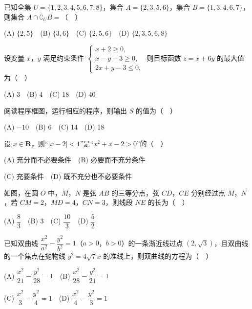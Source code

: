 

\begin{question}
已知全集 \(U=\{1,2,3,4,5,6,7,8\}\)，集合 \(A=\{2,3,5,6\}\)，集合 \(B=\{1,3,4,6,7\}\)，则集合 \(A\cap\complement_U B=\)（　）

(A) \(\{2,5\}\)　(B) \(\{3,6\}\)　(C) \(\{2,5,6\}\)　(D) \(\{2,3,5,6,8\}\)

\end{question}
\begin{question}
设变量 \(x\)，\(y\) 满足约束条件 \(\begin{cases}x+2\geqslant0,\\x-y+3\geqslant0,\\2x+y-3\leqslant0,\end{cases}\) 则目标函数 \(z=x+6y\) 的最大值为（　）

(A) 3　(B) 4　(C) 18　(D) 40

\Needspace{0.4\textheight}
\end{question}
\begin{question}
阅读程序框图，运行相应的程序，则输出 \(S\) 的值为（　）
\nopagebreak[4]
\begin{center}\end{center}
\nopagebreak[4]
(A) \(-10\)　(B) 6　(C) 14　(D) 18

\end{question}
\begin{question}
设 \(x\in\mathbf{R}\)，则“\(|x-2|<1\)”是“\(x^2+x-2>0\)”的（　）

(A) 充分而不必要条件　(B) 必要而不充分条件

(C) 充要条件　(D) 既不充分也不必要条件

\Needspace{0.4\textheight}
\end{question}
\begin{question}
如图，在圆 \(O\) 中，\(M\)，\(N\) 是弦 \(AB\) 的三等分点，弦 \(CD\)，\(CE\) 分别经过点 \(M\)，\(N\)，若 \(CM=2\)，\(MD=4\)，\(CN=3\)，则线段 \(NE\) 的长为（　）
\nopagebreak[4]
\begin{center}\end{center}
\nopagebreak[4]
(A) \(\dfrac{8}{3}\)　(B) 3　(C) \(\dfrac{10}{3}\)　(D) \(\dfrac{5}{2}\)

\end{question}
\begin{question}
已知双曲线 \(\dfrac{x^2}{a^2}-\dfrac{y^2}{b^2}=1\)（\(a>0\)，\(b>0\)）的一条渐近线过点 \((2,\sqrt{3})\)，且双曲线的一个焦点在抛物线 \(y^2=4\sqrt{7}x\) 的准线上，则双曲线的方程为（　）

(A) \(\dfrac{x^2}{21}-\dfrac{y^2}{28}=1\)　(B) \(\dfrac{x^2}{28}-\dfrac{y^2}{21}=1\)

(C) \(\dfrac{x^2}{3}-\dfrac{y^2}{4}=1\)　(D) \(\dfrac{x^2}{4}-\dfrac{y^2}{3}=1\)

\end{question}
